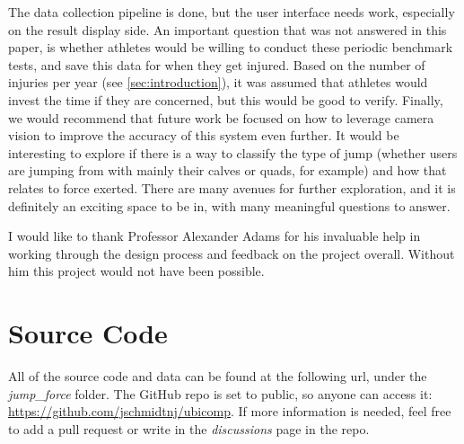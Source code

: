 \documentclass[manuscript,screen,review]{acmart}
\begin{document}
The data collection pipeline is done, but the user interface needs work, especially on the result display side. An important question that was not answered in this paper, is whether athletes would be willing to conduct these periodic benchmark tests, and save this data for when they get injured. Based on the number of injuries per year (see \ref{sec:introduction}), it was assumed that athletes would invest the time if they are concerned, but this would be good to verify. Finally, we would recommend that future work be focused on how to leverage camera vision to improve the accuracy of this system even further. It would be interesting to explore if there is a way to classify the type of jump (whether users are jumping from with mainly their calves or quads, for example) and how that relates to force exerted. There are many avenues for further exploration, and it is definitely an exciting space to be in, with many meaningful questions to answer.

\newpage

\begin{acks}
I would like to thank Professor Alexander Adams for his invaluable help in working through the design process and feedback on the project overall. Without him this project would not have been possible.
\end{acks}




\appendix

\section{Source Code}

All of the source code and data can be found at the following url, under the \textit{jump\_force} folder. The GitHub repo is set to public, so anyone can access it: \url{https://github.com/jschmidtnj/ubicomp}. If more information is needed, feel free to add a pull request or write in the \textit{discussions} page in the repo.
\end{document}
